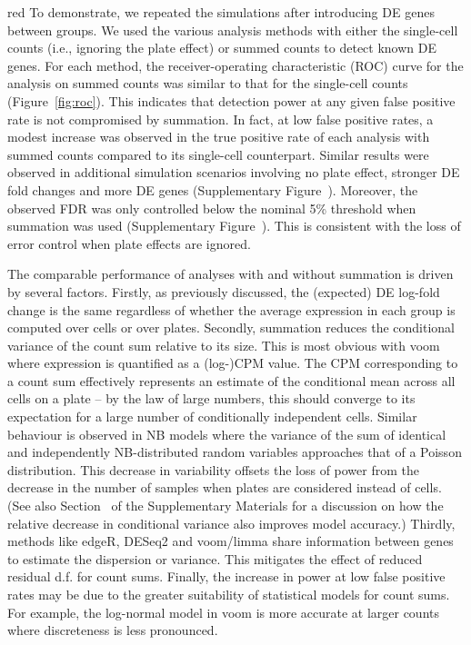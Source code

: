 \documentclass[oupdraft]{bio}
\begin{document}
\begin{color}{red}
To demonstrate, we repeated the simulations after introducing DE genes between groups.
We used the various analysis methods with either the single-cell counts (i.e., ignoring the plate effect) or summed counts to detect known DE genes.
For each method, the receiver-operating characteristic (ROC) curve for the analysis on summed counts was similar to that for the single-cell counts (Figure~\ref{fig:roc}).
This indicates that detection power at any given false positive rate is not compromised by summation.
In fact, at low false positive rates, a modest increase was observed in the true positive rate of each analysis with summed counts compared to its single-cell counterpart.
Similar results were observed in additional simulation scenarios involving no plate effect, stronger DE fold changes and more DE genes (Supplementary Figure~\supppowerroc{}).
Moreover, the observed FDR was only controlled below the nominal 5\% threshold when summation was used (Supplementary Figure~\supppowerfdr{}).
This is consistent with the loss of error control when plate effects are ignored.

The comparable performance of analyses with and without summation is driven by several factors. 
Firstly, as previously discussed, the (expected) DE log-fold change is the same regardless of whether the average expression in each group is computed over cells or over plates. 
Secondly, summation reduces the conditional variance of the count sum relative to its size.
This is most obvious with voom where expression is quantified as a (log-)CPM value.
The CPM corresponding to a count sum effectively represents an estimate of the conditional mean across all cells on a plate -- by the law of large numbers, this should converge to its expectation for a large number of conditionally independent cells.
Similar behaviour is observed in NB models where the variance of the sum of identical and independently NB-distributed random variables approaches that of a Poisson distribution.
This decrease in variability offsets the loss of power from the decrease in the number of samples when plates are considered instead of cells.
(See also Section~\suppmeanvar{} of the Supplementary Materials for a discussion on how the relative decrease in conditional variance also improves model accuracy.)
Thirdly, methods like edgeR, DESeq2 and voom/limma share information between genes to estimate the dispersion or variance. 
This mitigates the effect of reduced residual d.f. for count sums.
Finally, the increase in power at low false positive rates may be due to the greater suitability of statistical models for count sums.
For example, the log-normal model in voom is more accurate at larger counts where discreteness is less pronounced.
\end{color}
\end{document}
